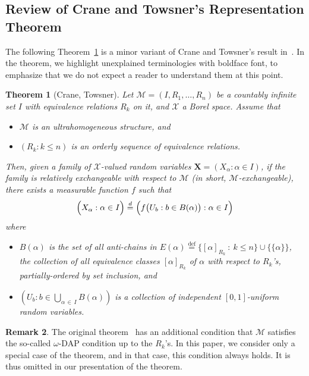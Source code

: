 \documentclass[10pt]{amsart}
\newtheorem{theo}{Theorem}[section]
\theoremstyle{definition}\newtheorem{defi}[theo]{Definition}\newtheorem{rema}[theo]{Remark}\newtheorem{exam}[theo]{Example}\newtheorem{exem}[theo]{Example}\newtheorem{nota}[theo]{Notation}
\newcommand*{\defeq}{\stackrel{\mathrm{def}}{=}}
\renewcommand{\d}{\buildrel{d}\over{=}}
\newcommand*\XX{{\mathcal{X}}}
\newcommand*\MM{\mathcal{M}}
\newcommand*\bX{\mathbf{X}}
\begin{document}
\subsection{Review of Crane and Towsner's Representation Theorem}

The following Theorem~\ref{thm: CraneTowsner equivalence relations} is a minor variant of Crane and Towsner's result in~\cite{crane2018relatively}. In the theorem, we highlight unexplained terminologies with boldface font, to emphasize that we do not expect a reader to understand them at this point.
\begin{theo}[Crane, Towsner]\label{thm: CraneTowsner equivalence relations}
Let $\MM=(I,R_1,\ldots,R_n)$ be a countably infinite set $I$ with equivalence relations $R_k$ on it, and $\XX$ a Borel space. Assume that
\begin{itemize}
\item $\MM$ is an \emph{ultrahomogeneous structure}, and
\item $(R_k : k \leq n)$ is an \emph{orderly sequence} of equivalence relations.
\end{itemize}
Then, given a family of $\XX$-valued random variables $\bX = (X_\alpha : \alpha \in I)$, if the family is \emph{relatively exchangeable with respect to $\MM$} (in short, \emph{$\MM$-exchangeable}), there exists a measurable function $f$ such that
\begin{equation}\label{equation: CraneTowsner representation with equivalence relations}
\Big(X_\alpha : \alpha \in I\Big) \d \Big(f\big(U_b : b \in B(\alpha)\big) : \alpha \in I\Big)
\end{equation}
where
\begin{itemize}
\item $B(\alpha)$ is the set of all \emph{anti-chains} in $E(\alpha)
\defeq \{[\alpha]_{R_k}~:~k\leq n\}\cup\{\{\alpha\}\}$, the collection of all equivalence classes $[\alpha]_{R_k}$ of $\alpha$ with respect to $R_k$'s, partially-ordered by set inclusion, and
\item $(U_b : b \in \bigcup_{\alpha\,\in\,I} B(\alpha))$ is a collection of independent $[0,1]$-uniform random variables.
\end{itemize}
\end{theo}

\begin{rema}
The original theorem~\cite{crane2018relatively} has an additional condition that $\MM$ satisfies the so-called $\omega$-DAP condition up to the $R_k$'s. In this paper, we consider only a special case of the theorem, and in that case, this condition always holds. It is thus omitted in our presentation of the theorem.
\end{rema}
\end{document}

